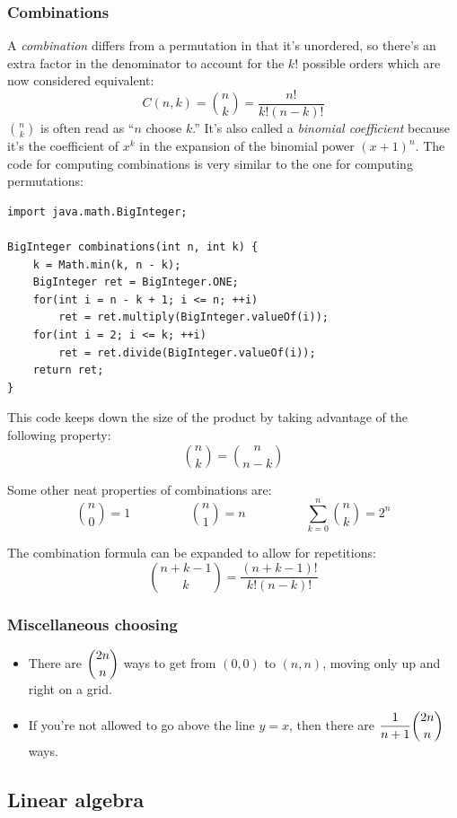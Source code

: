 \documentclass[a4paper,12pt]{article}
\begin{document}
\subsubsection{Combinations}
A {\em combination} differs from a permutation in that it's unordered, so there's an extra factor in the denominator to account for the $k!$ possible orders which are now considered equivalent:
\[C(n,k) = {n \choose k} = \frac{n!}{k!(n-k)!}\]
\noindent ${n \choose k}$ is often read as ``$n$ choose $k$.'' It's also called a {\em binomial coefficient} because it's the coefficient of $x^k$ in the expansion of the binomial power $\left(x+1\right)^n$. The code for computing combinations is very similar to the one for computing permutations:

\begin{lstlisting}
import java.math.BigInteger;

BigInteger combinations(int n, int k) {
	k = Math.min(k, n - k);
	BigInteger ret = BigInteger.ONE;
	for(int i = n - k + 1; i <= n; ++i)
		ret = ret.multiply(BigInteger.valueOf(i));
	for(int i = 2; i <= k; ++i)
		ret = ret.divide(BigInteger.valueOf(i));
	return ret;
}
\end{lstlisting}

This code keeps down the size of the product by taking advantage of the following property:
\[{n \choose k}={n \choose {n-k}}\]

Some other neat properties of combinations are:
\[{n \choose 0}=1 \hspace{2cm} {n \choose 1}=n \hspace{2cm} \sum_{k=0}^{n}{n \choose k}=2^n\]

The combination formula can be expanded to allow for repetitions:
\[{{n + k - 1}\choose k}=\frac{(n+k-1)!}{k!(n-k)!}\]

\subsubsection{Miscellaneous choosing}
\begin{itemize}
\item There are $\dbinom{2n}{n}$ ways to get from $(0,0)$ to $(n,n)$, moving only up and right on a grid.
\item If you're not allowed to go above the line $y=x$, then there are $\dfrac{1}{n+1}\dbinom{2n}{n}$ ways.
\end{itemize}

\subsection{Linear algebra}
\end{document}
